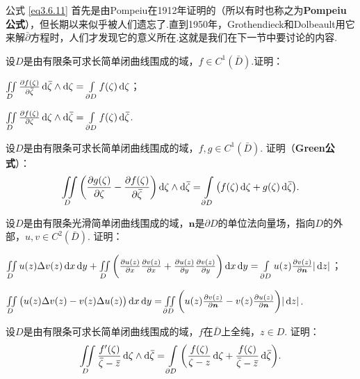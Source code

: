 公式 \eqref{eq3.6.11} 首先是由Pompeiu在1912年证明的（所以有时也称之为\textbf{Pompeiu公式}），但长期以来似乎被人们遗忘了.直到1950年，Grothendieck和Dolbeault用它来解$\bar\partial$方程时，人们才发现它的意义所在.这就是我们在下一节中要讨论的内容.
\begin{xiti}
  \item 设$D$是由有限条可求长简单闭曲线围成的域，$f\in C^1(\bar D)$.证明：
    \begin{enuma}
      \item $\iint\limits_D\pp{f(\zeta)}{\bar\zeta}\dif \bar\zeta\wedge\dif \zeta=\int\limits_{\partial D}f(\zeta)\dif \zeta$；
      \item $\iint\limits_D\pp{f(\zeta)}{\zeta}\dif \zeta\wedge\dif \bar\zeta=\int\limits_{\partial D}f(\zeta)\dif \bar\zeta$.
    \end{enuma}
  \item 设$D$是由有限条可求长简单闭曲线围成的域，$f,g\in C^1(\bar D)$. 证明（\textbf{Green公式}）：
    \[
      \iint\limits_D\bigg(\pp{g(\zeta)}\zeta-\pp{f(\zeta)}{\bar\zeta}\bigg)
      \dif \zeta\wedge\dif \bar\zeta=\int\limits_{\partial D}
      \big(f(\zeta)\dif \zeta+g(\zeta)\dif \bar\zeta\big).
    \]
  \item 设$D$是由有限条光滑简单闭曲线围成的域，$\boldsymbol n$是$\partial D$的单位法向量场，指向$D$的外部，$u,v\in C^2(\bar D)$. 证明：
    \begin{enuma}
      \item $\iint\limits_Du(z)\Delta v(z)\dx\dy+\iint\limits_D\bigg(
        \pp{u(z)}x\pp{v(z)}x+\pp{u(z)}y\pp{v(z)}y\bigg)\dx\dy=\int\limits_{\partial D}
        u(z)\pp{v(z)}{\boldsymbol n}|\dz|$；
      \item $\iint\limits_D\big(u(z)\Delta v(z)-v(z)\Delta u(z)\big)\dx\dy
        =\iint\limits_{\partial D}\bigg(u(z)\pp{v(z)}{\boldsymbol n}
        -v(z)\pp{u(z)}{\boldsymbol n}\bigg)|\dz|$.
    \end{enuma}
  \item 设$D$是由有限条可求长简单闭曲线围成的域，$f$在$\bar D$上全纯，$z\in D$. 证明：
    \[
      \iint\limits_D\frac{f'(\zeta)}{\bar\zeta-\bar z}\dif \zeta\wedge\dif \bar\zeta
      = \int\limits_{\partial D}\bigg(\frac{f(\zeta)}{\zeta-z}\dif \zeta+\frac{f(\zeta)}{\bar \zeta-\bar z}\dif \bar\zeta\bigg).
    \]
\end{xiti}

